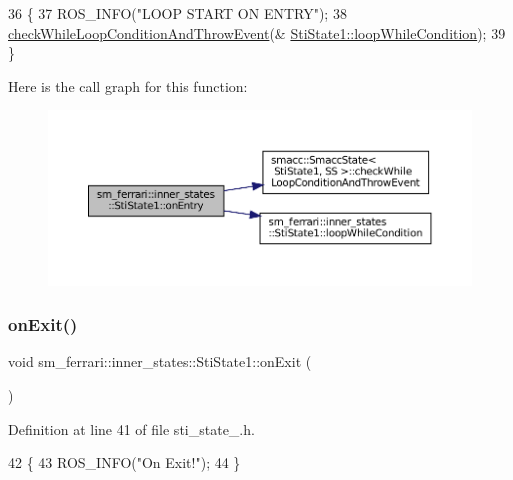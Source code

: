 \begin{DoxyCode}
36   \{
37     ROS\_INFO(\textcolor{stringliteral}{"LOOP START ON ENTRY"});
38     \hyperlink{classsmacc_1_1SmaccState_a80082718f226bebedb589f0c4696001d}{checkWhileLoopConditionAndThrowEvent}(&
      \hyperlink{structsm__ferrari_1_1inner__states_1_1StiState1_a6ffaddc2045557b0382fdcfde4628a08}{StiState1::loopWhileCondition});
39   \}
\end{DoxyCode}
Here is the call graph for this function\+:
\nopagebreak
\begin{figure}[H]
\begin{center}
\leavevmode
\includegraphics[width=350pt]{structsm__ferrari_1_1inner__states_1_1StiState1_ab9fc82e0e28d198180fa5ade750a9131_cgraph}
\end{center}
\end{figure}
\mbox{\label{structsm__ferrari_1_1inner__states_1_1StiState1_acaaf68eb35fa368ca08f9b47e4b8c46e}} 
\subsubsection{\texorpdfstring{on\+Exit()}{onExit()}}
{\footnotesize\ttfamily void sm\+\_\+ferrari\+::inner\+\_\+states\+::\+Sti\+State1\+::on\+Exit (\begin{DoxyParamCaption}{ }\end{DoxyParamCaption})\hspace{0.3cm}{\ttfamily [inline]}}



Definition at line 41 of file sti\+\_\+state\+\_.\+h.


\begin{DoxyCode}
42   \{
43     ROS\_INFO(\textcolor{stringliteral}{"On Exit!"});
44   \}
\end{DoxyCode}
\mbox{\label{structsm__ferrari_1_1inner__states_1_1StiState1_ab7b8160481f81f821d960ebb167734cc}} 
